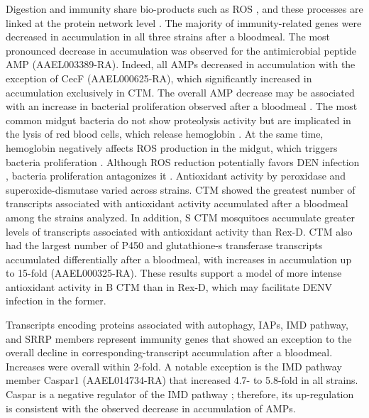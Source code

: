 Digestion and immunity share bio-products such as \gls{ROS} \cite{Molina-Cruz2008}, and these processes are linked at the protein network level \cite{Guo2010}.
The majority of immunity-related genes were decreased in accumulation in all three strains after a bloodmeal.
The most pronounced decrease in accumulation was observed for the antimicrobial peptide \gls{AMP} (AAEL003389-RA).
Indeed, all AMPs decreased in accumulation with the exception of CecF (AAEL000625-RA), which significantly increased in accumulation exclusively in \gls{CTM}.
The overall AMP decrease may be associated with an increase in bacterial proliferation observed after a bloodmeal \cite{Oliveira2011}.
The most common midgut bacteria do not show proteolysis activity but are implicated in the lysis of red blood cells, which release hemoglobin \cite{Gaio2011}.
At the same time, hemoglobin negatively affects ROS production in the midgut, which triggers bacteria proliferation \cite{Oliveira2011}.
Although ROS reduction potentially favors DEN infection \cite{Oliveira2011}, bacteria proliferation antagonizes it \cite{Xi2008}.
Antioxidant activity by peroxidase and superoxide-dismutase varied across strains.
\gls{CTM} showed the greatest number of transcripts associated with antioxidant activity accumulated after a bloodmeal among the strains analyzed.
In addition, S \gls{CTM} mosquitoes accumulate greater levels of transcripts associated with antioxidant activity than \gls{Rex-D}.
\gls{CTM} also had the largest number of P450 and glutathione-s transferase transcripts accumulated differentially after a bloodmeal, with increases in accumulation up to 15-fold (AAEL000325-RA).
These results support a model of more intense antioxidant activity in B \gls{CTM} than in \gls{Rex-D}, which may facilitate DENV infection in the former.

Transcripts encoding proteins associated with autophagy, IAPs, IMD pathway, and SRRP members represent immunity genes that showed an exception to the overall decline in corresponding-transcript accumulation after a bloodmeal.
Increases were overall within 2-fold.
A notable exception is the IMD pathway member Caspar1 (AAEL014734-RA) that increased 4.7- to 5.8-fold in all strains.
Caspar is a negative regulator of the IMD pathway \cite{Kim2006caspar}; therefore, its up-regulation is consistent with the observed decrease in accumulation of AMPs.

